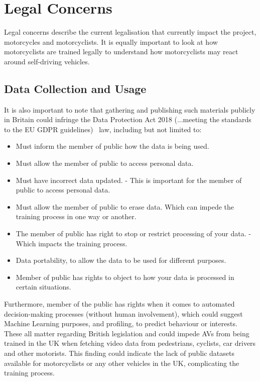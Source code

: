 \documentclass[12pt]{report} %
\begin{document}
\chapter{Legal Concerns}
\label{chap:legalConcerns}
	Legal concerns describe the current legalisation that currently impact the project, motorcycles and motorcyclists. It is equally important to look at how motorcyclists are trained legally to understand how motorcyclists may react around self-driving vehicles.

	\section{Data Collection and Usage}
		It is also important to note that gathering and publishing such materials publicly in Britain could infringe the Data Protection Act 2018 (...meeting the standards to the EU GDPR guidelines)~\cite{govuk_data_2018} law, including but not limited to:

		\begin{itemize}
			\item Must inform the member of public how the data is being used.
			\item Must allow the member of public to access personal data.
			\item Must have incorrect data updated. - This is important for the member of public to access personal data.
			\item Must allow the member of public to erase data. Which can impede the training process in one way or another.
			\item The member of public has right to stop or restrict processing of your data. - Which impacts the training process.
			\item Data portability, to allow the data to be used for different purposes.
			\item Member of public has rights to object to how your data is processed in certain situations.
		\end{itemize}

		Furthermore, member of the public has rights when it comes to automated decision-making processes (without human involvement), which could suggest Machine Learning purposes, and profiling, to predict behaviour or interests. These all matter regarding British legislation and could impede AVs from being trained in the UK when fetching video data from pedestrians, cyclists, car drivers and other motorists. This finding could indicate the lack of public datasets available for motorcyclists or any other vehicles in the UK, complicating the training process.
	
\end{document}
